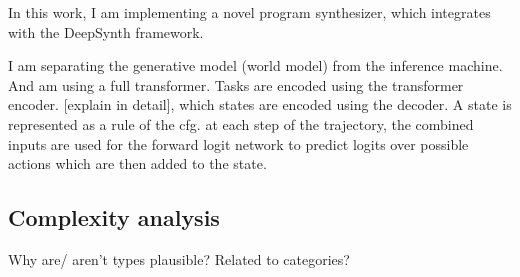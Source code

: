 In this work, I am implementing a novel program synthesizer, which integrates with the DeepSynth framework. 

I am separating the generative model (world model) from the inference machine. And am using a full transformer.
Tasks are encoded using the transformer encoder. [explain in detail], which states are encoded using the decoder. A state is represented as a rule of the cfg.
at each step of the trajectory, the combined inputs are used for the forward logit network to predict logits over possible actions which are then added to the state.


\subsection{Complexity analysis}


Why are/ aren't types plausible? Related to categories? 